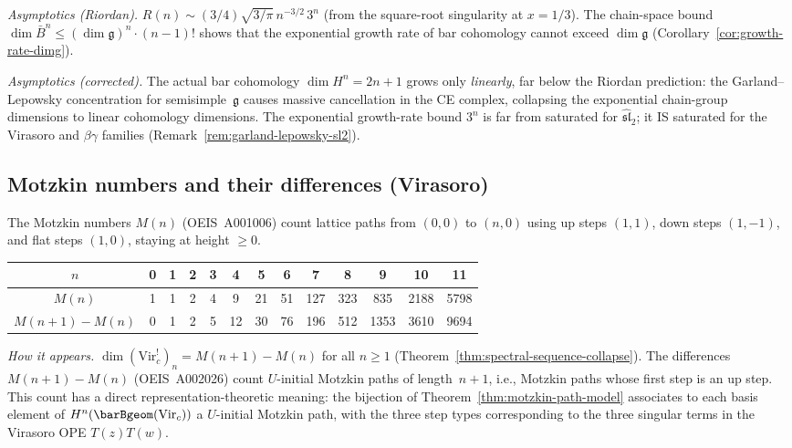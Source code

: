 \emph{Asymptotics (Riordan).}
$R(n) \sim (3/4)\sqrt{3/\pi}\, n^{-3/2}\, 3^n$ (from the square-root singularity at $x = 1/3$). The chain-space bound $\dim\bar{B}^n \leq (\dim\mathfrak{g})^n \cdot (n-1)!$ shows that the exponential growth rate of bar cohomology cannot exceed $\dim\mathfrak{g}$ (Corollary~\ref{cor:growth-rate-dimg}).

\emph{Asymptotics (corrected).}
The actual bar cohomology $\dim H^n = 2n+1$ grows only \emph{linearly}, far below the Riordan prediction: the Garland--Lepowsky concentration for semisimple~$\mathfrak{g}$ causes massive cancellation in the CE complex, collapsing the exponential chain-group dimensions to linear cohomology dimensions. The exponential growth-rate bound $3^n$ is far from saturated for $\widehat{\mathfrak{sl}}_2$; it IS saturated for the Virasoro and $\beta\gamma$ families (Remark~\ref{rem:garland-lepowsky-sl2}).

\subsection{Motzkin numbers and their differences (Virasoro)}
\label{subsec:motzkin}

The Motzkin numbers $M(n)$ (OEIS~A001006) count lattice paths from $(0,0)$ to $(n,0)$ using up steps $(1,1)$, down steps $(1,-1)$, and flat steps $(1,0)$, staying at height $\geq 0$.

\begin{center}
\renewcommand{\arraystretch}{1.2}
\begin{tabular}{c|cccccccccccc}
$n$ & 0 & 1 & 2 & 3 & 4 & 5 & 6 & 7 & 8 & 9 & 10 & 11 \\
\hline
$M(n)$ & 1 & 1 & 2 & 4 & 9 & 21 & 51 & 127 & 323 & 835 & 2188 & 5798 \\
$M(n{+}1) - M(n)$ & 0 & 1 & 2 & 5 & 12 & 30 & 76 & 196 & 512 & 1353 & 3610 & 9694
\end{tabular}
\end{center}

\emph{How it appears.}
$\dim(\mathrm{Vir}_c^!)_n = M(n+1) - M(n)$ for all $n \geq 1$ (Theorem~\ref{thm:spectral-sequence-collapse}). The differences $M(n+1) - M(n)$ (OEIS~A002026) count $U$-initial Motzkin paths of length~$n+1$, i.e., Motzkin paths whose first step is an up step. This count has a direct representation-theoretic meaning: the bijection of Theorem~\ref{thm:motzkin-path-model} associates to each basis element of $H^n(\barBgeom(\mathrm{Vir}_c))$ a $U$-initial Motzkin path, with the three step types corresponding to the three singular terms in the Virasoro OPE $T(z)T(w)$.


